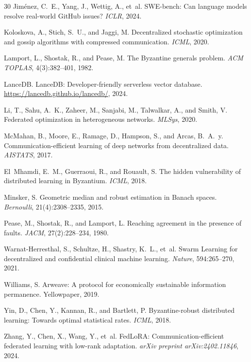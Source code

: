 \documentclass[11pt]{article}
\begin{document}
\begin{thebibliography}{30}
Jim{\'e}nez, C.~E., Yang, J., Wettig, A., et~al.
\newblock SWE-bench: Can language models resolve real-world {GitHub} issues?
\newblock \emph{ICLR}, 2024.

Koloskova, A., Stich, S.~U., and Jaggi, M.
\newblock Decentralized stochastic optimization and gossip algorithms with
  compressed communication.
\newblock \emph{ICML}, 2020.

Lamport, L., Shostak, R., and Pease, M.
\newblock The Byzantine generals problem.
\newblock \emph{ACM TOPLAS}, 4(3):382--401, 1982.

LanceDB.
\newblock LanceDB: Developer-friendly serverless vector database.
\newblock \url{https://lancedb.github.io/lancedb/}, 2024.

Li, T., Sahu, A.~K., Zaheer, M., Sanjabi, M., Talwalkar, A., and Smith, V.
\newblock Federated optimization in heterogeneous networks.
\newblock \emph{MLSys}, 2020.

McMahan, B., Moore, E., Ramage, D., Hampson, S., and Arcas, B.~A.~y.
\newblock Communication-efficient learning of deep networks from decentralized
  data.
\newblock \emph{AISTATS}, 2017.

El~Mhamdi, E.~M., Guerraoui, R., and Rouault, S.
\newblock The hidden vulnerability of distributed learning in {B}yzantium.
\newblock \emph{ICML}, 2018.

Minsker, S.
\newblock Geometric median and robust estimation in {Banach} spaces.
\newblock \emph{Bernoulli}, 21(4):2308--2335, 2015.

Pease, M., Shostak, R., and Lamport, L.
\newblock Reaching agreement in the presence of faults.
\newblock \emph{JACM}, 27(2):228--234, 1980.

Warnat-Herresthal, S., Schultze, H., Shastry, K.~L., et~al.
\newblock Swarm Learning for decentralized and confidential clinical machine
  learning.
\newblock \emph{Nature}, 594:265--270, 2021.

Williams, S.
\newblock Arweave: A protocol for economically sustainable information
  permanence.
\newblock Yellowpaper, 2019.

Yin, D., Chen, Y., Kannan, R., and Bartlett, P.
\newblock Byzantine-robust distributed learning: Towards optimal statistical
  rates.
\newblock \emph{ICML}, 2018.

Zhang, Y., Chen, X., Wang, Y., et~al.
\newblock FedLoRA: Communication-efficient federated learning with low-rank
  adaptation.
\newblock \emph{arXiv preprint arXiv:2402.11846}, 2024.

\end{thebibliography}
\end{document}
